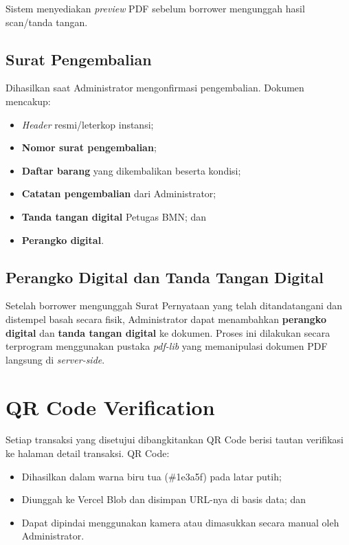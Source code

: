 \documentclass[
  12pt,
  a4paper,
  oneside,
  final
]{report}
\begin{document}
Sistem menyediakan {\it preview} PDF sebelum borrower
mengunggah hasil scan/tanda tangan.

\subsection{Surat Pengembalian}
Dihasilkan saat Administrator mengonfirmasi pengembalian.
Dokumen mencakup:
\begin{itemize}
  \item {\it Header} resmi/leterkop instansi;
  \item {\bfseries Nomor surat pengembalian};
  \item {\bfseries Daftar barang} yang dikembalikan beserta kondisi;
  \item {\bfseries Catatan pengembalian} dari Administrator;
  \item {\bfseries Tanda tangan digital} Petugas BMN; dan
  \item {\bfseries Perangko digital}.
\end{itemize}

\subsection{Perangko Digital dan Tanda Tangan Digital}
Setelah borrower mengunggah Surat Pernyataan yang telah
ditandatangani dan distempel basah secara fisik, Administrator
dapat menambahkan {\bfseries perangko digital} dan
{\bfseries tanda tangan digital} ke dokumen. Proses ini
dilakukan secara terprogram menggunakan pustaka {\it pdf-lib}
yang memanipulasi dokumen PDF langsung di {\it server-side}.

\section{QR Code Verification}

Setiap transaksi yang disetujui dibangkitankan QR Code berisi
tautan verifikasi ke halaman detail transaksi. QR Code:
\begin{itemize}
  \item Dihasilkan dalam warna biru tua (\#1e3a5f) pada latar putih;
  \item Diunggah ke Vercel Blob dan disimpan URL-nya
        di basis data; dan
  \item Dapat dipindai menggunakan kamera atau dimasukkan secara
        manual oleh Administrator.
\end{itemize}
\end{document}
